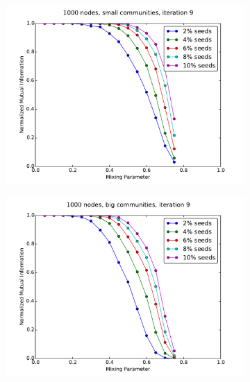 \begin{figure}
    \centering
    \begin{subfigure}{0.5\textwidth}
    \includegraphics[width=\linewidth]{allplots/nonoverlap_iter_a.pdf}
    \end{subfigure}%
    \begin{subfigure}{0.5\textwidth}
    \includegraphics[width=\linewidth]{allplots/nonoverlap_iter_b.pdf}
    \end{subfigure}
    \begin{subfigure}{0.5\textwidth}

\end{subfigure}
\end{figure}
